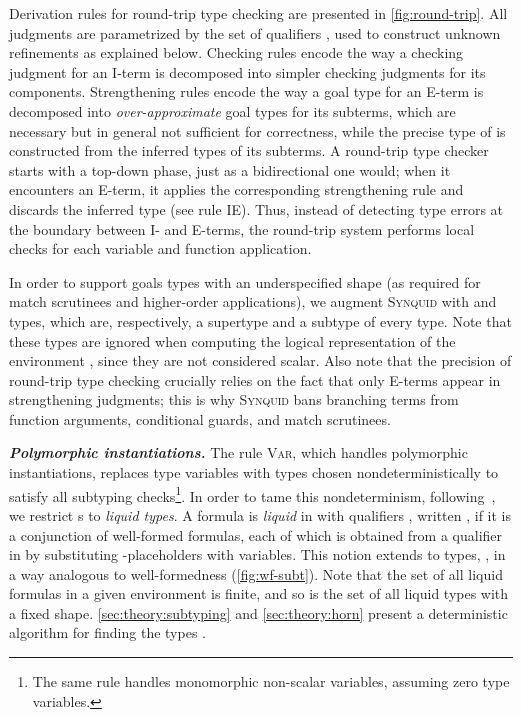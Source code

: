 \documentclass[10pt,preprint]{sigplanconf-pldi16}
\theoremstyle{definition}
\newcommand{\custompar}[1]{\parskip 0pt \textbf{\textit{#1}}}
\newcommand{\lang}{\textsc{Synquid}\xspace}
\begin{document}
Derivation rules for round-trip type checking are presented in \autoref{fig:round-trip}.
All judgments are parametrized by the set of qualifiers ,
used to construct unknown refinements as explained below.
Checking rules encode the way a checking judgment for an I-term  is decomposed into simpler checking judgments for its components.
Strengthening rules encode the way a goal type for an E-term  is decomposed into \emph{over-approximate} goal types for its subterms, 
which are necessary but in general not sufficient for correctness,
while the precise type of  is constructed from the inferred types of its subterms.
A round-trip type checker starts with a top-down phase, just as a bidirectional one would;
when it encounters an E-term, it applies the corresponding strengthening rule and discards the inferred type (see rule \textsc{IE}).
Thus, instead of detecting type errors at the boundary between I- and E-terms,
the round-trip system performs local checks for each variable and function application.

In order to support goals types with an underspecified shape
(as required for match scrutinees and higher-order applications),
we augment \lang with  and  types,
which are, respectively, a supertype and a subtype of every type.
Note that these types are ignored when computing the logical representation of the environment ,
since they are not considered scalar.
Also note that the precision of round-trip type checking crucially relies
on the fact that only E-terms appear in strengthening judgments;
this is why \lang bans branching terms from function arguments, conditional guards, and match scrutinees.

\custompar{Polymorphic instantiations.}
The rule \textsc{Var}, which handles polymorphic instantiations,
replaces type variables  with types  chosen nondeterministically to satisfy all subtyping checks\footnote{The same rule handles monomorphic non-scalar variables, assuming zero type variables.}.
In order to tame this nondeterminism, following~\cite{RondonKaJh08}, we restrict s to \emph{liquid types}.
A formula  is \emph{liquid} in  with qualifiers ,
written ,
if it is a conjunction of well-formed formulas, 
each of which is obtained from a qualifier in  by substituting -placeholders with variables.
This notion extends to types, , in a way analogous to well-formedness (\autoref{fig:wf-subt}).
Note that the set of all liquid formulas in a given environment is finite,
and so is the set of all liquid types with a fixed shape.
\autoref{sec:theory:subtyping} and \autoref{sec:theory:horn} present a deterministic algorithm for finding the types . 
\end{document}
